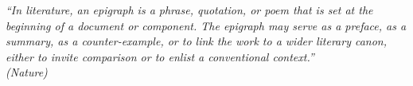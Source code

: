 \begin{epigrafe}
    \vspace*{\fill}
	\begin{flushright}
		\textit{``In literature, an epigraph is a phrase, quotation, or poem that is set at the beginning of a document or component. The epigraph may serve as a preface, as a summary, as a counter-example, or to link the work to a wider literary canon, either to invite comparison or to enlist a conventional context.'' \\
			(Nature)}
	\end{flushright}
\end{epigrafe}
